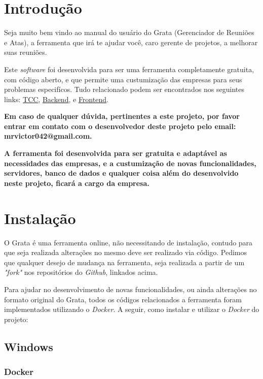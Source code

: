 \section{Introdução}

Seja muito bem vindo ao manual do usuário do Grata (Gerenciador de Reuniões e Atas), a ferramenta que irá te ajudar você, caro gerente de projetos, a melhorar suas reuniões.

Este \textit{software} foi desenvolvida para ser uma ferramenta completamente gratuita, com código aberto, e que permite uma custumização das empresas para seus problemas especifícos. Tudo relacionado podem ser encontrados nos seguintes links: \href{https://github.com/FGAProjects/TCC}{TCC}, \href{https://github.com/MrVictor42/Grata-Backend-v2}{Backend}, e \href{https://github.com/MrVictor42/Grata-Frontend-v2}{Frontend}. 

\textbf{Em caso de qualquer dúvida, pertinentes a este projeto, por favor entrar em contato com o desenvolvedor deste projeto pelo email: mrvictor042@gmail.com.}

\textbf{A ferramenta foi desenvolvida para ser gratuita e adaptável as necessidades das empresas, e a custumização de novas funcionalidades, servidores, banco de dados e qualquer coisa além do desenvolvido neste projeto, ficará a cargo da empresa.}

\section{Instalação}

O Grata é uma ferramenta online, não necessitando de instalação, contudo para que seja realizada alterações no mesmo deve ser realizado via código. Pedimos que qualquer desejo de mudança na ferramenta, seja realizada a partir de um \textit{"fork"} nos repositórios do \textit{Github}, linkados acima.

Para ajudar no desenvolvimento de novas funcionalidades, ou ainda alterações no formato original do Grata, todos os códigos relacionados a ferramenta foram implementados utilizando o \textit{Docker}. A seguir, como instalar e utilizar o \textit{Docker} do projeto:

\subsection{Windows}

\subsubsection{Docker}


